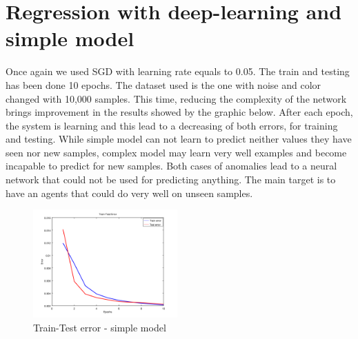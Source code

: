 \section{Regression with deep-learning and simple model}
Once again we used SGD with learning rate equals to 0.05. The train and testing has been done 10 epochs. The dataset used is the one with noise and color changed with 10,000 samples. This time, reducing the complexity of the network brings improvement in the results showed by the graphic below. After each epoch, the system is learning and this lead to a decreasing of both errors, for training and testing. While simple model can not learn to predict neither values they have seen nor new samples, complex model may learn very well examples and become incapable to predict for new samples. Both cases of anomalies lead to a neural network that could not be used for predicting anything. The main target is to have an agents that could do very well on unseen samples.
\newpage
\begin{figure}[h]
	\begin{center}
		\includegraphics[width=209px,height=157px]{src/img/results/small-network}
		\caption{Train-Test error - simple model} \label{fig:100tt}
    \end{center}
\end{figure}




